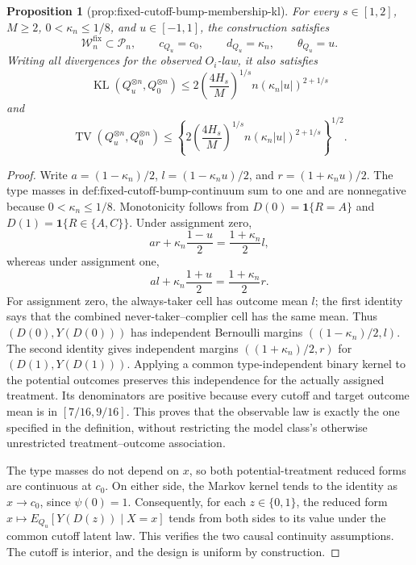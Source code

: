 \documentclass{article}
\newtheorem{proposition}{Proposition}
\begin{document}
\begin{proposition}[prop:fixed-cutoff-bump-membership-kl]\label{prop:fixed-cutoff-bump-membership-kl}
For every \(s\in[1,2]\), \(M\ge2\), \(0<\kappa_n\le1/8\), and
\(u\in[-1,1]\), the construction satisfies
\[
 \mathcal W_n^{\mathrm{fix}}\subset\mathcal P_n,
 \qquad c_{Q_u}=c_0,
 \qquad d_{Q_u}=\kappa_n,
 \qquad \theta_{Q_u}=u.
\]
Writing all divergences for the observed \(O_i\)-law, it also satisfies
\[
 \operatorname{KL}(Q_u^{\otimes n},Q_0^{\otimes n})
 \le
 2\left(\frac{4H_s}{M}\right)^{1/s}
 n(\kappa_n|u|)^{2+1/s}
\]
and
\[
 \operatorname{TV}(Q_u^{\otimes n},Q_0^{\otimes n})
 \le
 \left\{2\left(\frac{4H_s}{M}\right)^{1/s}
 n(\kappa_n|u|)^{2+1/s}\right\}^{1/2}.
\]
\end{proposition}
\begin{proof}
Write \(a=(1-\kappa_n)/2\),
\(l=(1-\kappa_nu)/2\), and \(r=(1+\kappa_nu)/2\).
The type masses in \(\text{def:fixed-cutoff-bump-continuum}\) sum to one
and are nonnegative because \(0<\kappa_n\le1/8\).  Monotonicity follows
from \(D(0)=\mathbf 1\{R=A\}\) and
\(D(1)=\mathbf 1\{R\in\{A,C\}\}\).  Under assignment zero,
\[
 a r+\kappa_n\frac{1-u}{2}
 =\frac{1+\kappa_n}{2}l,
\]
whereas under assignment one,
\[
 a l+\kappa_n\frac{1+u}{2}
 =\frac{1+\kappa_n}{2}r.
\]
For assignment zero, the always-taker cell has outcome mean \(l\); the
first identity says that the combined never-taker--complier cell has the
same mean.  Thus \((D(0),Y(D(0)))\) has independent Bernoulli margins
\(((1-\kappa_n)/2,l)\).  The second identity gives independent margins
\(((1+\kappa_n)/2,r)\) for \((D(1),Y(D(1)))\).  Applying a common
type-independent binary kernel to the potential outcomes preserves this
independence for the actually assigned treatment.  Its denominators are
positive because every cutoff and target outcome mean is in
\([7/16,9/16]\).  This proves that the observable law is exactly the one
specified in the definition, without restricting the model class's
otherwise unrestricted treatment--outcome association.

The type masses do not depend on \(x\), so both potential-treatment
reduced forms are continuous at \(c_0\).  On either side, the Markov
kernel tends to the identity as \(x\to c_0\), since \(\psi(0)=1\).
Consequently, for each \(z\in\{0,1\}\), the reduced form
\(x\mapsto E_{Q_u}[Y(D(z))\mid X=x]\) tends from both sides to its value
under the common cutoff latent law.  This verifies the two causal
continuity assumptions.  The cutoff is interior, and the design is
uniform by construction.


\end{proof}
\end{document}
